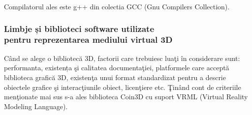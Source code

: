 \par Compilatorul ales este g++ din colectia GCC (Gnu Compilers Collection). 

\subsubsection{Limbje și biblioteci software utilizate \\ pentru reprezentarea mediului virtual 3D}

\par Când se alege o bibliotecă 3D, factorii care trebuiesc luaţi în considerare sunt: performanta,
existența şi calitatea documentaţiei, platformele care acceptă biblioteca grafică 3D, existenţa unui
format standardizat pentru a descrie obiectele grafice şi interacţiunile obiect, licenţiere etc. Ţinând cont de criteriile menţionate mai sus s-a ales biblioteca Coin3D cu suport VRML (Virtual Reality Modeling
Language). 


